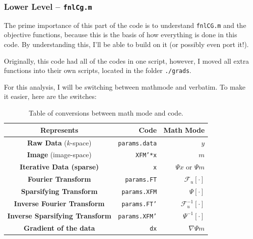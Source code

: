 \documentclass[11 pt]{article}
\begin{document}
    \subsubsection{Lower Level -- \texttt{fnlCg.m}}

      The prime importance of this part of the code is to understand \texttt{fnlCG.m} and the objective functions, because this is the basis of how everything is done in this code. By understanding this, I'll be able to build on it (or possibly even port it!).

      Originally, this code had all of the codes in one script, however, I moved all extra functions into their own scripts, located in the folder \texttt{./grads}.

      For this analysis, I will be switching between mathmode and verbatim. To make it easier, here are the switches:

      \begin{table}[h]
            \centering
            \begin{tabular}{| c || r | r | }
             \hline
             \textbf{Represents}                     & \textbf{Code}          & \textbf{Math Mode}          \\  \hline \hline
             \textbf{Raw Data} ($k$-space)           & \texttt{params.data}   & $y$                         \\  \hline
             \textbf{Image} (image-space)            & \texttt{XFM'*x}        & $m$                         \\  \hline
             \textbf{Iterative Data (sparse)}        & \texttt{x}             & $\Psi x$ or $\Psi m$                  \\  \hline
             \textbf{Fourier Transform}              & \texttt{params.FT}     & $\mathcal{F}_u[\cdot]$      \\  \hline
             \textbf{Sparsifying Transform}          & \texttt{params.XFM}    & $\Psi[\cdot]$               \\  \hline
             \textbf{Inverse Fourier Transform}      & \texttt{params.FT'}    & $\mathcal{F}_u^{-1}[\cdot]$ \\  \hline
             \textbf{Inverse Sparsifying Transform}  & \texttt{params.XFM'}   & $\Psi^{-1}[\cdot]$          \\  \hline
             \textbf{Gradient of the data}           & \texttt{dx}            & $\nabla \Psi m$          \\  \hline
            \end{tabular}
            \caption{Table of conversions between math mode and code.}
            \label{tab:conv}
            \end{table}
\end{document}
